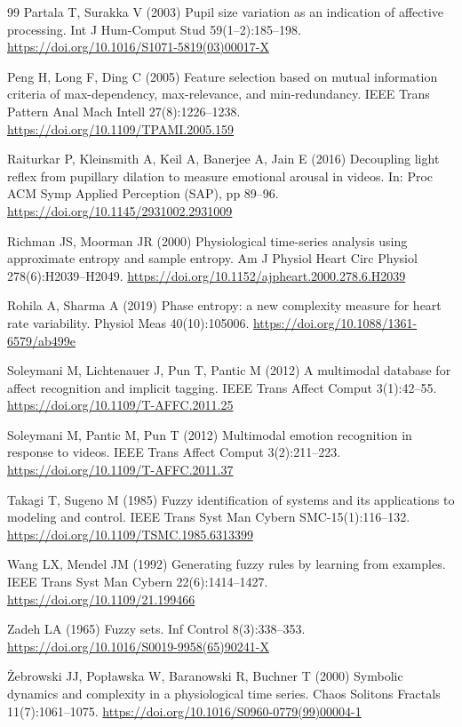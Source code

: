 \documentclass[11pt,a4paper]{article}
\begin{document}
\begin{thebibliography}{99}
 Partala T, Surakka V (2003) Pupil size variation as an indication of affective processing. Int J Hum-Comput Stud 59(1--2):185--198. \url{https://doi.org/10.1016/S1071-5819(03)00017-X}

 Peng H, Long F, Ding C (2005) Feature selection based on mutual information criteria of max-dependency, max-relevance, and min-redundancy. IEEE Trans Pattern Anal Mach Intell 27(8):1226--1238. \url{https://doi.org/10.1109/TPAMI.2005.159}

 Raiturkar P, Kleinsmith A, Keil A, Banerjee A, Jain E (2016) Decoupling light reflex from pupillary dilation to measure emotional arousal in videos. In: Proc ACM Symp Applied Perception (SAP), pp 89--96. \url{https://doi.org/10.1145/2931002.2931009}

 Richman JS, Moorman JR (2000) Physiological time-series analysis using approximate entropy and sample entropy. Am J Physiol Heart Circ Physiol 278(6):H2039--H2049. \url{https://doi.org/10.1152/ajpheart.2000.278.6.H2039}

 Rohila A, Sharma A (2019) Phase entropy: a new complexity measure for heart rate variability. Physiol Meas 40(10):105006. \url{https://doi.org/10.1088/1361-6579/ab499e}

 Soleymani M, Lichtenauer J, Pun T, Pantic M (2012) A multimodal database for affect recognition and implicit tagging. IEEE Trans Affect Comput 3(1):42--55. \url{https://doi.org/10.1109/T-AFFC.2011.25}

 Soleymani M, Pantic M, Pun T (2012) Multimodal emotion recognition in response to videos. IEEE Trans Affect Comput 3(2):211--223. \url{https://doi.org/10.1109/T-AFFC.2011.37}

 Takagi T, Sugeno M (1985) Fuzzy identification of systems and its applications to modeling and control. IEEE Trans Syst Man Cybern SMC-15(1):116--132. \url{https://doi.org/10.1109/TSMC.1985.6313399}

 Wang LX, Mendel JM (1992) Generating fuzzy rules by learning from examples. IEEE Trans Syst Man Cybern 22(6):1414--1427. \url{https://doi.org/10.1109/21.199466}

 Zadeh LA (1965) Fuzzy sets. Inf Control 8(3):338--353. \url{https://doi.org/10.1016/S0019-9958(65)90241-X}

 \.Zebrowski JJ, Pop\l awska W, Baranowski R, Buchner T (2000) Symbolic dynamics and complexity in a physiological time series. Chaos Solitons Fractals 11(7):1061--1075. \url{https://doi.org/10.1016/S0960-0779(99)00004-1}


\end{thebibliography}
\end{document}
